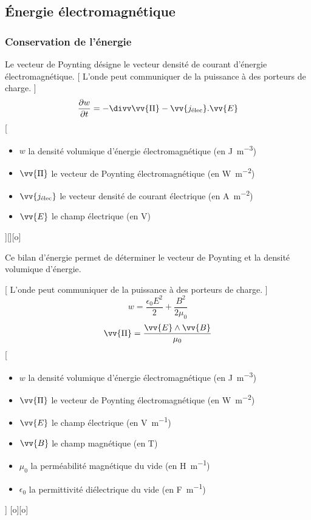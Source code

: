 
\subsection{Énergie électromagnétique}
\subsubsection{Conservation de l'énergie}
Le vecteur de Poynting désigne le vecteur densité de courant d'énergie électromagnétique.
[
    L'onde peut communiquer de la puissance à des porteurs de charge.
]
{
    $$\frac{\partial w}{\partial t}=-\divv\vv{\Pi} - \vv{j_\text{élec}}.\vv{E}$$
}
[
    \begin{itemize}
        \item $w$ la densité volumique d'énergie électromagnétique (en \unit{J.m^{-3}})
        \item $\vv{\Pi}$ le vecteur de Poynting électromagnétique (en \unit{W.m^{-2}})
        \item $\vv{j_\text{élec}}$ le vecteur densité de courant électrique (en \unit{A.m^{-2}})
        \item $\vv{E}$ le champ électrique (en \unit{V})
    \end{itemize}
][][o]

Ce bilan d'énergie permet de déterminer le vecteur de Poynting et la densité volumique d'énergie.

[
    L'onde peut communiquer de la puissance à des porteurs de charge.
]
{
    $$w=\frac{\epsilon_0E^2}{2}+\frac{B^2}{2\mu_0}$$
    $$\vv{\Pi}=\frac{\vv{E}\wedge\vv{B}}{\mu_0}$$
}
[
    \begin{itemize}
        \item $w$ la densité volumique d'énergie électromagnétique (en \unit{J.m^{-3}})
        \item $\vv{\Pi}$ le vecteur de Poynting électromagnétique (en \unit{W.m^{-2}})
        \item $\vv{E}$ le champ électrique (en \unit{V.m^{-1}})
        \item $\vv{B}$ le champ magnétique (en \unit{T})
        \item $\mu_0$ la perméabilité magnétique du vide (en \unit{H.m^{-1}})
        \item $\epsilon_0$ la permittivité diélectrique du vide (en \unit{F.m^{-1}})
    \end{itemize}
]
[o][o]

